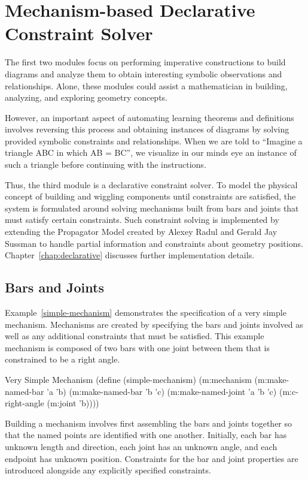 \section{Mechanism-based Declarative Constraint Solver}

The first two modules focus on performing imperative constructions to
build diagrams and analyze them to obtain interesting symbolic
observations and relationships. Alone, these modules could assist a
mathematician in building, analyzing, and exploring geometry
concepts.

However, an important aspect of automating learning theorems and
definitions involves reversing this process and obtaining instances of
diagrams by solving provided symbolic constraints and
relationships. When we are told to ``Imagine a triangle ABC in which
AB = BC'', we visualize in our minds eye an instance of such a
triangle before continuing with the instructions.

Thus, the third module is a declarative constraint solver. To model
the physical concept of building and wiggling components until
constraints are satisfied, the system is formulated around solving
mechanisms built from bars and joints that must satisfy certain
constraints. Such constraint solving is implemented by extending the
Propagator Model created by Alexey Radul and Gerald Jay Sussman
\cite{gjs-propagator} to handle partial information and constraints
about geometry positions. Chapter~\ref{chap:declarative} discusses
further implementation details.

\subsection{Bars and Joints}

Example~\ref{simple-mechanism} demonstrates the specification of a
very simple mechanism. Mechanisms are created by specifying the bars
and joints involved as well as any additional constraints that must be
satisfied. This example mechanism is composed of two bars with one
joint between them that is constrained to be a right angle.

\begin{code-example}
[label=simple-mechanism]
{Very Simple Mechanism}
(define (simple-mechanism)
  (m:mechanism
   (m:make-named-bar 'a 'b)
   (m:make-named-bar 'b 'c)
   (m:make-named-joint 'a 'b 'c)
   (m:c-right-angle (m:joint 'b))))
\end{code-example}

Building a mechanism involves first assembling the bars and joints
together so that the named points are identified with one
another. Initially, each bar has unknown length and direction, each
joint has an unknown angle, and each endpoint has unknown
position. Constraints for the bar and joint properties are introduced
alongside any explicitly specified constraints.

